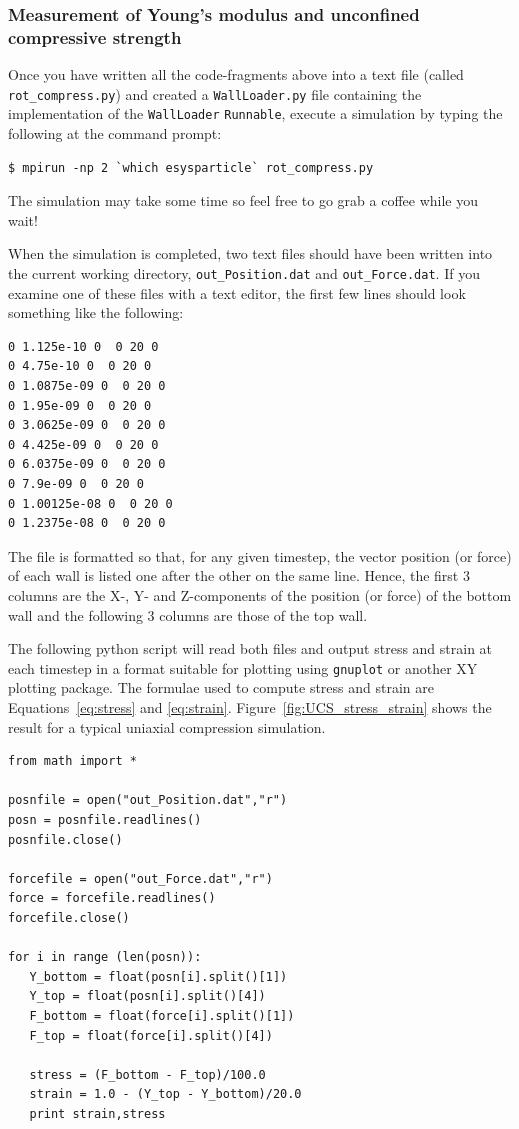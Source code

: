 \subsubsection[Measurement of Young's modulus \& unconfined compressive strength]{Measurement of Young's modulus and unconfined compressive strength}

Once you have written all the code-fragments above into a text file (called \texttt{rot\_\+com\+press.py}) and created a \texttt{WallLoader.py} file containing the implementation of the \texttt{Wall\+Load\+er} \texttt{Runnable}, execute a simulation by typing the following at the command prompt:

\begin{verbatim}
$ mpirun -np 2 `which esysparticle` rot_compress.py
\end{verbatim}

\noindent
The simulation may take some time so feel free to go grab a coffee while you wait! 

When the simulation is completed, two text files should have been written into the current working directory, \texttt{out\_Position.dat} and \texttt{out\_Force.dat}. If you examine one of these files with a text editor, the first few lines should look something like the following:

\begin{verbatim}
0 1.125e-10 0  0 20 0  
0 4.75e-10 0  0 20 0  
0 1.0875e-09 0  0 20 0  
0 1.95e-09 0  0 20 0  
0 3.0625e-09 0  0 20 0  
0 4.425e-09 0  0 20 0  
0 6.0375e-09 0  0 20 0  
0 7.9e-09 0  0 20 0  
0 1.00125e-08 0  0 20 0  
0 1.2375e-08 0  0 20 0
\end{verbatim}

\noindent
The file is formatted so that, for any given timestep, the vector position (or force) of each wall is listed one after the other on the same line. Hence, the first 3 columns are the X-, Y- and Z-components of the position (or force) of the bottom wall and the following 3 columns are those of the top wall. 

The following python script will read both files and output stress and strain at each timestep in a format suitable for plotting using \texttt{gnuplot} or another XY plotting package. The formulae used to compute stress and strain are Equations~\ref{eq:stress} and \ref{eq:strain}. Figure~\ref{fig:UCS_stress_strain} shows the result for a typical uniaxial compression simulation.

\begin{verbatim}
from math import *

posnfile = open("out_Position.dat","r")
posn = posnfile.readlines()
posnfile.close()

forcefile = open("out_Force.dat","r")
force = forcefile.readlines()
forcefile.close()

for i in range (len(posn)):
   Y_bottom = float(posn[i].split()[1])
   Y_top = float(posn[i].split()[4])
   F_bottom = float(force[i].split()[1])
   F_top = float(force[i].split()[4])

   stress = (F_bottom - F_top)/100.0
   strain = 1.0 - (Y_top - Y_bottom)/20.0
   print strain,stress
\end{verbatim}

